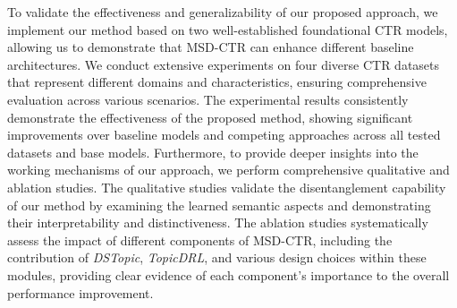 To validate the effectiveness and generalizability of our proposed approach, we implement our method based on two well-established foundational CTR models, allowing us to demonstrate that MSD-CTR can enhance different baseline architectures. We conduct extensive experiments on four diverse CTR datasets that represent different domains and characteristics, ensuring comprehensive evaluation across various scenarios. The experimental results consistently demonstrate the effectiveness of the proposed method, showing significant improvements over baseline models and competing approaches across all tested datasets and base models. Furthermore, to provide deeper insights into the working mechanisms of our approach, we perform comprehensive qualitative and ablation studies. The qualitative studies validate the disentanglement capability of our method by examining the learned semantic aspects and demonstrating their interpretability and distinctiveness. The ablation studies systematically assess the impact of different components of MSD-CTR, including the contribution of \textit{DSTopic}, \textit{TopicDRL}, and various design choices within these modules, providing clear evidence of each component's importance to the overall performance improvement.